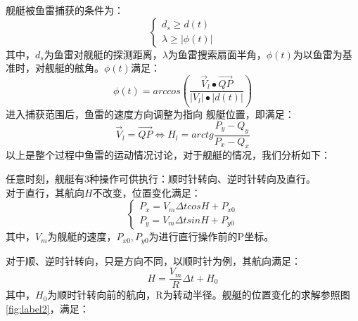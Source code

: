 \documentclass[12pt]{article}%
\begin{document}
舰艇被鱼雷捕获的条件为：
\begin{equation}\label{buhuotiaojian}
\left\{ 
\begin{array}{c}
d_s\ge d(t)  \\
\lambda \ge| \phi(t)|
\end{array} \right.  
\end{equation}
其中，$d_s$为鱼雷对舰艇的探测距离，$\lambda$为鱼雷搜索扇面半角，$\phi(t)$为以鱼雷为基准时，对舰艇的舷角。$\phi(t)$满足：
\begin{equation}\label{jiao}
\phi(t)=arccos\left(\frac{\vec V_l\bullet \overrightarrow{QP}}{|V_l|\bullet|d(t)|}\right)
\end{equation}
进入捕获范围后，鱼雷的速度方向调整为指向
舰艇位置，即满足：
\begin{equation}\label{jiantingweizhi}
\vec V_l = \overrightarrow{QP} \Leftrightarrow H_l=arctg\frac{P_y-Q_y}{P_x-Q_x}
\end{equation}
以上是整个过程中鱼雷的运动情况讨论，对于舰艇的情况，我们分析如下：

任意时刻，舰艇有3种操作可供执行：顺时针转向、逆时针转向及直行。\\
对于直行，其航向$H$不改变，位置变化满足：
\begin{equation}\label{jiantingzhiweizhi}
\left\{ 
\begin{array}{c}
P_x=V_m\Delta tcosH +P_{x0}\\
P_y=V_m\Delta tsinH+P_{y0}
\end{array} \right. 
\end{equation}
其中，$V_m$为舰艇的速度，$P_{x0},P_{y0}$为进行直行操作前的P坐标。

对于顺、逆时针转向，只是方向不同，以顺时针为例，其航向满足：
\begin{equation}\label{jiantinghangxiang}
H=\frac{V_m}{R}\Delta t+H_0
\end{equation}
其中，$H_0$为顺时针转向前的航向，R为转动半径。舰艇的位置变化的求解参照图\ref{fig:label2}，满足：
\end{document}
